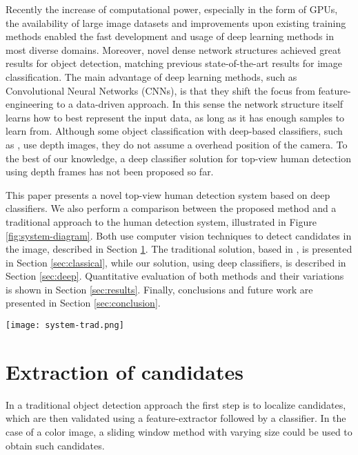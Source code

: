   Recently the increase of computational power, especially in the form of GPUs, the availability of large image datasets and improvements upon existing training methods \cite{nair2010relu} enabled the fast development and usage of deep learning methods in most diverse domains. Moreover, novel dense network structures \cite{NIPS2013_5207} achieved great results for object detection, matching previous state-of-the-art results \cite{hintonCONVNET} for image classification. The main advantage of deep learning methods, such as Convolutional Neural Networks (CNNs), is that they shift the focus from feature-engineering to a data-driven approach. In this sense the network structure itself learns how to best represent the input data, as long as it has enough samples to learn from. Although some object classification with deep-based classifiers, such as \cite{thornberg2015combining}, use depth images, they do not assume a overhead position of the camera. To the best of our knowledge, a deep classifier solution for top-view human detection using depth frames has not been proposed so far.

  This paper presents a novel top-view human detection system based on deep classifiers. We also perform a comparison between the proposed method and a traditional approach to the human detection system, illustrated in Figure \ref{fig:system-diagram}. Both use computer vision techniques to detect candidates in the image, described in Section \ref{sec:candidates}. The traditional solution, based in \cite{rauter}, is presented in Section \ref{sec:classical}, while our solution, using deep classifiers, is described in Section \ref{sec:deep}. Quantitative evaluation of both methods and their variations is shown in Section \ref{sec:results}. Finally, conclusions and future work are presented in Section \ref{sec:conclusion}.

  \begin{figure*}[!t]
  \centering
  \texttt{[image: system-trad.png]}
  \caption{Human detection system diagram. Two candidates are detected on the input frame.  }
  \label{fig:system-diagram}
  \end{figure*}

\section{Extraction of candidates}
\label{sec:candidates}

    In a traditional object detection approach \cite{traditional-objdetect} the first step is to localize candidates, which are then validated using a feature-extractor followed by a classifier. In the case of a color image, a sliding window method with varying size could be used to obtain such candidates.

